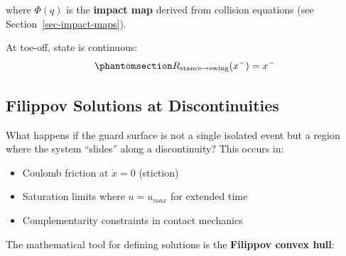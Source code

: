 \documentclass[
  letterpaper,
  DIV=11,
  numbers=noendperiod]{scrartcl}
\providecommand{\tightlist}{%
  \setlength{\itemsep}{0pt}\setlength{\parskip}{0pt}}\usepackage{longtable,booktabs,array}
\begin{document}
where \(\Phi(q)\) is the \textbf{impact map} derived from collision
equations (see Section~\ref{sec-impact-maps}).

At toe-off, state is continuous:
\begin{equation}\phantomsection\label{eq-swing-reset}{
R_{\text{stance} \to \text{swing}}(x^-) = x^-
}\end{equation}

\subsection{Filippov Solutions at
Discontinuities}\label{filippov-solutions-at-discontinuities}

What happens if the guard surface is not a single isolated event but a
region where the system ``slides'' along a discontinuity? This occurs
in:

\begin{itemize}
\tightlist
\item
  Coulomb friction at \(\dot{x} = 0\) (stiction)
\item
  Saturation limits where \(u = u_{max}\) for extended time
\item
  Complementarity constraints in contact mechanics
\end{itemize}

The mathematical tool for defining solutions is the \textbf{Filippov
convex hull}:
\end{document}
